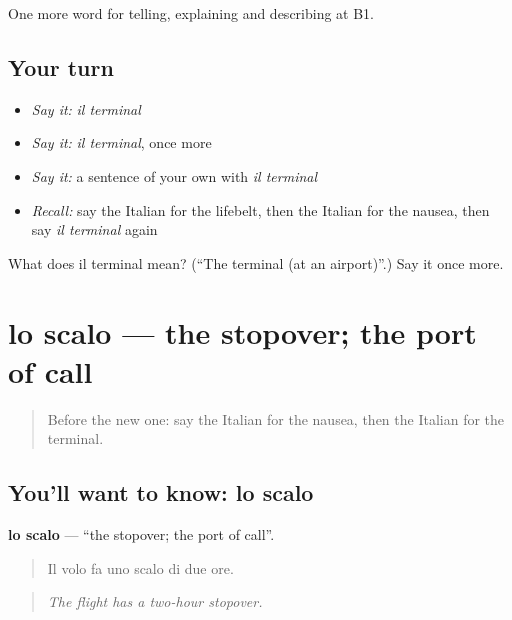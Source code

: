 \begin{grammarlens}[title={What you've built}]
One more word for telling, explaining and describing at B1.
\end{grammarlens}

\subsection*{Your turn}
\begin{itemize}
\raggedright
  \item \emph{Say it:} \emph{il terminal}
  \item \emph{Say it:} \emph{il terminal}, once more
  \item \emph{Say it:} a sentence of your own with \emph{il terminal}
  \item \emph{Recall:} say the Italian for the lifebelt, then the Italian for the nausea, then say \emph{il terminal} again
\end{itemize}

\begin{tcolorbox}[breakable,colback=teal!4,colframe=teal!35!black,title={Before you move on}]
What does il terminal mean? (\textquotedblleft{}The terminal (at an airport)\textquotedblright{}.) Say it once more.
\end{tcolorbox}
\section[lo scalo]{lo scalo — the stopover; the port of call}

\label{lesson:IT-C425-scalo}



\begin{quote}
Before the new one: say the Italian for the nausea, then the Italian for the terminal.
\end{quote}

\subsection*{You'll want to know: lo scalo}
\textbf{lo scalo} — \textquotedblleft{}the stopover; the port of call\textquotedblright{}.

\begin{quote}
Il volo fa uno scalo di due ore.
\end{quote}

\begin{quote}
\emph{The flight has a two-hour stopover.}
\end{quote}

